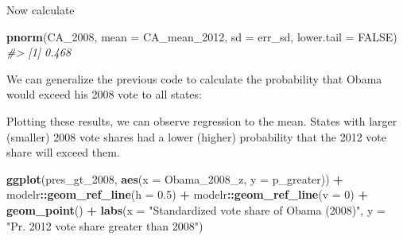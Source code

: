 \documentclass[]{book}
\newenvironment{Shaded}{\begin{snugshade}}{\end{snugshade}}
\newcommand{\CommentTok}[1]{\textcolor[rgb]{0.56,0.35,0.01}{\textit{#1}}}
\newcommand{\DataTypeTok}[1]{\textcolor[rgb]{0.13,0.29,0.53}{#1}}
\newcommand{\DecValTok}[1]{\textcolor[rgb]{0.00,0.00,0.81}{#1}}
\newcommand{\FloatTok}[1]{\textcolor[rgb]{0.00,0.00,0.81}{#1}}
\newcommand{\KeywordTok}[1]{\textcolor[rgb]{0.13,0.29,0.53}{\textbf{#1}}}
\newcommand{\NormalTok}[1]{#1}
\newcommand{\OperatorTok}[1]{\textcolor[rgb]{0.81,0.36,0.00}{\textbf{#1}}}
\newcommand{\OtherTok}[1]{\textcolor[rgb]{0.56,0.35,0.01}{#1}}
\newcommand{\StringTok}[1]{\textcolor[rgb]{0.31,0.60,0.02}{#1}}
\theoremstyle{definition}
\theoremstyle{definition}
\theoremstyle{definition}
\theoremstyle{remark}
\begin{document}
Now calculate

\begin{Shaded}
\begin{Highlighting}[]
\KeywordTok{pnorm}\NormalTok{(CA_}\DecValTok{2008}\NormalTok{, }\DataTypeTok{mean =}\NormalTok{ CA_mean_}\DecValTok{2012}\NormalTok{, }\DataTypeTok{sd =}\NormalTok{ err_sd,}
      \DataTypeTok{lower.tail =} \OtherTok{FALSE}\NormalTok{)}
\CommentTok{#> [1] 0.468}
\end{Highlighting}
\end{Shaded}

We can generalize the previous code to calculate the probability that
Obama would exceed his 2008 vote to all states:

\begin{Shaded}
\end{Shaded}

Plotting these results, we can observe regression to the mean. States
with larger (smaller) 2008 vote shares had a lower (higher) probability
that the 2012 vote share will exceed them.

\begin{Shaded}
\begin{Highlighting}[]
\KeywordTok{ggplot}\NormalTok{(pres_gt_}\DecValTok{2008}\NormalTok{, }\KeywordTok{aes}\NormalTok{(}\DataTypeTok{x =}\NormalTok{ Obama_}\DecValTok{2008}\NormalTok{_z, }\DataTypeTok{y =}\NormalTok{ p_greater)) }\OperatorTok{+}
\StringTok{  }\NormalTok{modelr}\OperatorTok{::}\KeywordTok{geom_ref_line}\NormalTok{(}\DataTypeTok{h =} \FloatTok{0.5}\NormalTok{) }\OperatorTok{+}
\StringTok{  }\NormalTok{modelr}\OperatorTok{::}\KeywordTok{geom_ref_line}\NormalTok{(}\DataTypeTok{v =} \DecValTok{0}\NormalTok{) }\OperatorTok{+}
\StringTok{  }\KeywordTok{geom_point}\NormalTok{() }\OperatorTok{+}
\StringTok{  }\KeywordTok{labs}\NormalTok{(}\DataTypeTok{x =} \StringTok{"Standardized vote share of Obama (2008)"}\NormalTok{,}
       \DataTypeTok{y =} \StringTok{"Pr. 2012 vote share greater than 2008"}\NormalTok{)}
\end{Highlighting}
\end{Shaded}
\end{document}
